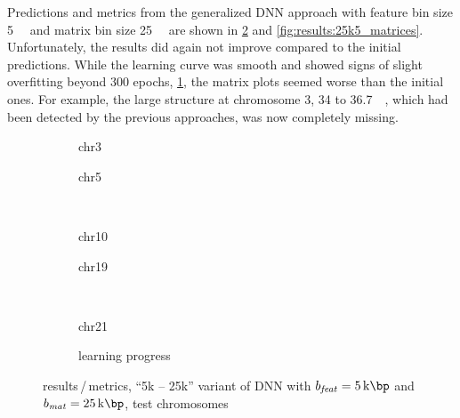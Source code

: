 Predictions and metrics from the generalized DNN approach with feature bin size \SI{5}{\kilo\bp} and matrix bin size \SI{25}{\kilo\bp}
are shown in \cref{fig:results:25k5DNN_pearson} and \ref{fig:results:25k5_matrices}.
Unfortunately, the results did again not improve compared to the initial predictions.
While the learning curve was smooth and showed signs of slight overfitting beyond 300 epochs, \cref{fig:results:25k5DNN_lossEpochs},
the matrix plots seemed worse than the initial ones. 
For example, the large structure at chromosome 3, 34 to \SI{36.7}{\kilo\bp}, which had been detected by the previous approaches, was now completely missing.
\begin{figure}[p]%
    \begin{subfigure}{0.45\textwidth}
        \scriptsize
        \caption{chr3}
    \end{subfigure} \hfill
    \begin{subfigure}{0.45\textwidth}
        \scriptsize
        \caption{chr5}
    \end{subfigure}\\[5mm]
    \begin{subfigure}{0.45\textwidth}
        \scriptsize
        \caption{chr10}
    \end{subfigure}\hfill
    \begin{subfigure}{0.45\textwidth}
        \scriptsize
        \caption{chr19}
    \end{subfigure}\\[3mm]
    \centering
    \begin{subfigure}{0.45\textwidth}
        \scriptsize
        \caption{chr21}
    \end{subfigure}\hfill
    \begin{subfigure}{0.45\textwidth}
        \caption{learning progress} \label{fig:results:25k5DNN_lossEpochs}
    \end{subfigure}
    \caption{results\,/\,metrics, ``5k -- 25k'' variant of DNN with $b_\mathit{feat}=\SI{5}{\kilo\bp}$ and $b_\mathit{mat}=\SI{25}{\kilo\bp}$,  test chromosomes}
    \label{fig:results:25k5DNN_pearson}
\end{figure}
